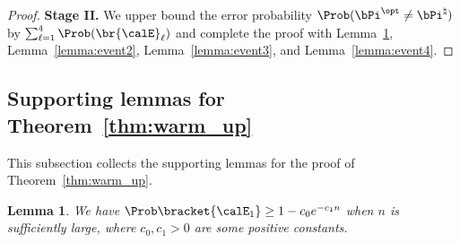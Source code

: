 \documentclass[11pt]{article}
\newtheorem{lemma}{Lemma}
\def \bPitrue {\bPi^{\natural}}
\def \bPiopt {\bPi^{\opt}}
\begin{document}
\begin{proof}
\vspace{0.1in}
\noindent
\textbf{Stage II.}
We upper bound the error probability $\Prob(\bPiopt \neq \bPitrue)$ by $\sum_{\ell=1}^4 \Prob(\br{\calE}_{\ell})$
and complete the proof with
Lemma~\ref{lemma:xpix_proximity},
Lemma~\ref{lemma:event2},
Lemma~\ref{lemma:event3}, and Lemma~\ref{lemma:event4}.
\end{proof}

\subsection{Supporting lemmas for Theorem~\ref{thm:warm_up}}
\label{subsec:appendix_proof_warm_up_support_lemma}

This subsection collects the supporting lemmas
for the proof of Theorem~\ref{thm:warm_up}.

\begin{lemma}
\label{lemma:xpix_proximity}
We have $\Prob\bracket{\calE_1}\geq 1-  c_0 e^{-c_1 n}$ when
$n$ is sufficiently large, where $c_0, c_1 > 0$ are some positive constants. 	
\end{lemma}
\end{document}
